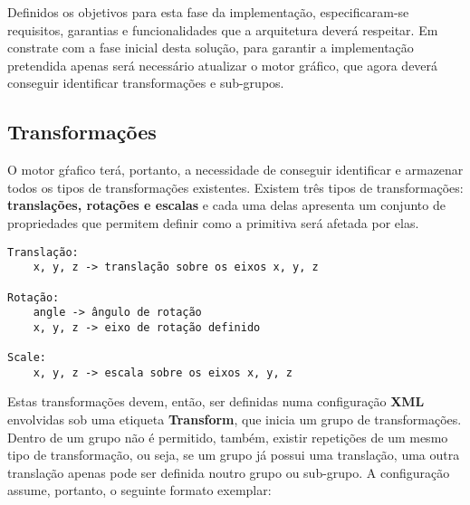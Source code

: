 Definidos os objetivos para esta fase da implementação,
especificaram-se requisitos, garantias e funcionalidades
que a arquitetura deverá respeitar.
\newline
\break
\noindent
Em constrate com a fase inicial desta solução, para
garantir a implementação pretendida apenas será
necessário atualizar o motor gráfico, que agora deverá
conseguir identificar transformações e sub-grupos.

\subsection{Transformações}

O motor gŕafico terá, portanto, a necessidade de
conseguir identificar e armazenar todos os tipos
de transformações existentes.
\newline
\break
\noindent
Existem três tipos de transformações:
\textbf{translações, rotações e escalas} e cada uma delas
apresenta um conjunto de propriedades que permitem
definir como a primitiva será afetada por elas.
\newline

\begin{tcolorbox}[
    colback=blue!10!white,
    colframe=black!50!black,
]
\begin{verbatim}
Translação:
    x, y, z -> translação sobre os eixos x, y, z

Rotação:
    angle -> ângulo de rotação
    x, y, z -> eixo de rotação definido

Scale:
    x, y, z -> escala sobre os eixos x, y, z
\end{verbatim}
\end{tcolorbox}

\vspace{12pt}
\noindent
Estas transformações devem, então, ser definidas numa
configuração \textbf{XML} envolvidas sob uma etiqueta
\textbf{Transform}, que inicia um grupo de
transformações.
\newline
\break
\noindent
Dentro de um grupo não é permitido, também,
existir repetições de um mesmo tipo de transformação,
ou seja, se um grupo já possui uma translação, uma outra
translação apenas pode ser definida noutro grupo ou
sub-grupo.
\newline
\break
\noindent
A configuração assume, portanto, o seguinte
formato exemplar:
\newline


